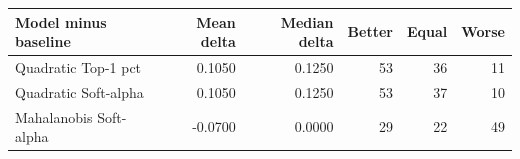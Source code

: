 \begin{tabular}{lrrrrr}
\toprule
Model minus baseline & Mean delta & Median delta & Better & Equal & Worse \\
\midrule
Quadratic Top-1 pct & 0.1050 & 0.1250 & 53 & 36 & 11 \\
Quadratic Soft-alpha & 0.1050 & 0.1250 & 53 & 37 & 10 \\
Mahalanobis Soft-alpha & -0.0700 & 0.0000 & 29 & 22 & 49 \\
\bottomrule
\end{tabular}
